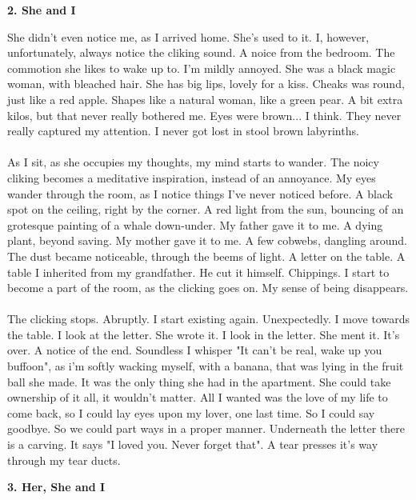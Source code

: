 \documentclass[]{article}
\begin{document}
\newpage

\begin{center}
	\large\textbf{2. She and I}
\end{center}

She didn't even notice me, as I arrived home. She's used to it. I, however, unfortunately, always notice the cliking sound. A noice from the bedroom. The commotion she likes to wake up to. I'm mildly annoyed. She was a black magic woman, with bleached hair. She has big lips, lovely for a kiss. Cheaks was round, just like a red apple. Shapes like a natural woman, like a green pear. A bit extra kilos, but that never really bothered me. Eyes were brown... I think. They never really captured my attention. I never got lost in stool brown labyrinths. 
\\ \\
As I sit, as she occupies my thoughts, my mind starts to wander. The noicy cliking becomes a meditative inspiration, instead of an annoyance. My eyes wander through the room, as I notice things I've never noticed before. A black spot on the ceiling, right by the corner. A red light from the sun, bouncing of an grotesque painting of a whale down-under. My father gave it to me. A dying plant, beyond saving. My mother gave it to me. A few cobwebs, dangling around. The dust became noticeable, through the beems of light. A letter on the table. A table I inherited from my grandfather. He cut it himself. Chippings. I start to become a part of the room, as the clicking goes on. My sense of being disappears. 
\\ \\
The clicking stops. Abruptly. I start existing again. Unexpectedly. I move towards the table. I look at the letter. She wrote it. I look in the letter. She ment it. It's over. A notice of the end. Soundless I whisper "It can't be real, wake up you buffoon", as i'm softly wacking myself, with a banana, that was lying in the fruit ball she made. It was the only thing she had in the apartment. She could take ownership of it all, it wouldn't matter. All I wanted was the love of my life to come back, so I could lay eyes upon my lover, one last time. So I could say goodbye. So we could part ways in a proper manner. Underneath the letter there is a carving. It says "I loved you. Never forget that". A tear presses it's way through my tear ducts.

\newpage

\begin{center}
	\large\textbf{3. Her, She and I}
\end{center}
\end{document}
